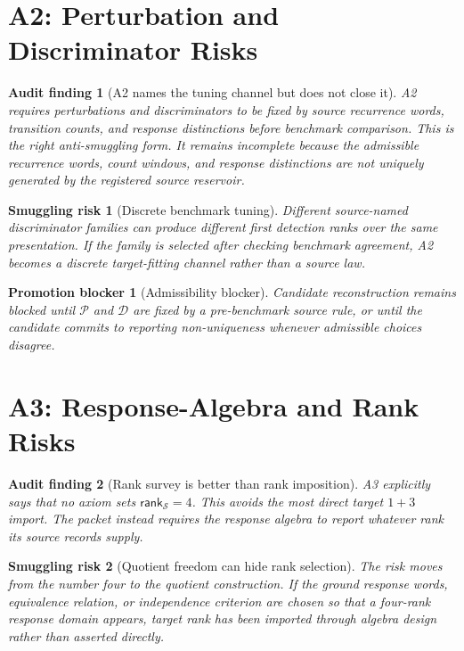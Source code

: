 \documentclass[11pt]{article}
\newcommand{\Rank}{\mathsf{rank}_{\mathcal{S}}}
\newtheorem{auditfinding}{Audit finding}
\newtheorem{smugglingrisk}{Smuggling risk}
\newtheorem{promotionblocker}{Promotion blocker}
\begin{document}
\section{A2: Perturbation and Discriminator Risks}

\begin{auditfinding}[A2 names the tuning channel but does not close it]
A2 requires perturbations and discriminators to be fixed by source recurrence
words, transition counts, and response distinctions before benchmark
comparison. This is the right anti-smuggling form. It remains incomplete
because the admissible recurrence words, count windows, and response
distinctions are not uniquely generated by the registered source reservoir.
\end{auditfinding}

\begin{smugglingrisk}[Discrete benchmark tuning]
Different source-named discriminator families can produce different first
detection ranks over the same presentation. If the family is selected after
checking benchmark agreement, A2 becomes a discrete target-fitting channel
rather than a source law.
\end{smugglingrisk}

\begin{promotionblocker}[Admissibility blocker]
Candidate reconstruction remains blocked until \(\mathcal{P}\) and
\(\mathcal{D}\) are fixed by a pre-benchmark source rule, or until the
candidate commits to reporting non-uniqueness whenever admissible choices
disagree.
\end{promotionblocker}

\section{A3: Response-Algebra and Rank Risks}

\begin{auditfinding}[Rank survey is better than rank imposition]
A3 explicitly says that no axiom sets \(\Rank=4\). This avoids the most direct
target \(1+3\) import. The packet instead requires the response algebra to
report whatever rank its source records supply.
\end{auditfinding}

\begin{smugglingrisk}[Quotient freedom can hide rank selection]
The risk moves from the number four to the quotient construction. If the
ground response words, equivalence relation, or independence criterion are
chosen so that a four-rank response domain appears, target rank has been
imported through algebra design rather than asserted directly.
\end{smugglingrisk}
\end{document}
